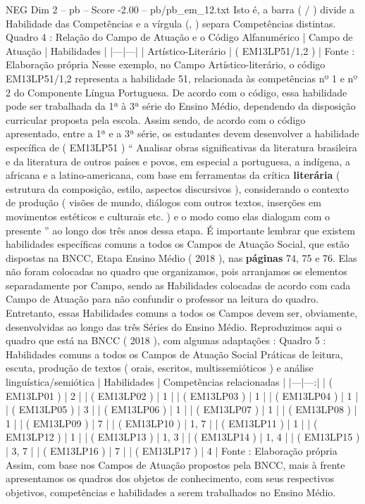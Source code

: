 \begin{textsample}{NEG Dim 2 – pb – Score -2.00 – pb/pb\_em\_12.txt}
Isto é, a barra ( / ) divide a Habilidade das Competências e a vírgula (, ) separa Competências distintas.
Quadro 4 : Relação do Campo de Atuação e o Código Alfanumérico | Campo de Atuação | Habilidades | |---|---| | Artístico-Literário | ( EM13LP51/1,2 ) | Fonte : Elaboração própria Nesse exemplo, no Campo Artístico-literário, o código EM13LP51/1,2 representa a habilidade 51, relacionada às competências nº 1 e nº 2 do Componente Língua Portuguesa.
De acordo com o código, essa habilidade pode ser trabalhada da 1ª à 3ª série do Ensino Médio, dependendo da disposição curricular proposta pela escola.
Assim sendo, de acordo com o código apresentado, entre a 1ª e a 3ª série, os estudantes devem desenvolver a habilidade específica de ( EM13LP51 ) “ Analisar obras significativas da literatura brasileira e da literatura de outros países e povos, em especial a portuguesa, a indígena, a africana e a latino-americana, com base em ferramentas da crítica \textbf{literária} ( estrutura da composição, estilo, aspectos discursivos ), considerando o contexto de produção ( visões de mundo, diálogos com outros textos, inserções em movimentos estéticos e culturais etc. ) e o modo como elas dialogam com o presente ” ao longo dos três anos dessa etapa.
É importante lembrar que existem habilidades específicas comuns a todos os Campos de Atuação Social, que estão dispostas na BNCC, Etapa Ensino Médio ( 2018 ), nas \textbf{páginas} 74, 75 e 76.
Elas não foram colocadas no quadro que organizamos, pois arranjamos os elementos separadamente por Campo, sendo as Habilidades colocadas de acordo com cada Campo de Atuação para não confundir o professor na leitura do quadro.
Entretanto, essas Habilidades comuns a todos os Campos devem ser, obviamente, desenvolvidas ao longo das três Séries do Ensino Médio.
Reproduzimos aqui o quadro que está na BNCC ( 2018 ), com algumas adaptações : Quadro 5 : Habilidades comuns a todos os Campos de Atuação Social Práticas de leitura, escuta, produção de textos ( orais, escritos, multissemióticos ) e análise linguística/semiótica | Habilidades | Competências relacionadas | |---|---:| | ( EM13LP01 ) | 2 | | ( EM13LP02 ) | 1 | | ( EM13LP03 ) | 1 | | ( EM13LP04 ) | 1 | | ( EM13LP05 ) | 3 | | ( EM13LP06 ) | 1 | | ( EM13LP07 ) | 1 | | ( EM13LP08 ) | 1 | | ( EM13LP09 ) | 7 | | ( EM13LP10 ) | 1, 7 | | ( EM13LP11 ) | 1 | | ( EM13LP12 ) | 1 | | ( EM13LP13 ) | 1, 3 | | ( EM13LP14 ) | 1, 4 | | ( EM13LP15 ) | 3, 7 | | ( EM13LP16 ) | 7 | | ( EM13LP17 ) | 4 | Fonte : Elaboração própria Assim, com base nos Campos de Atuação propostos pela BNCC, mais à frente apresentamos os quadros dos objetos de conhecimento, com seus respectivos objetivos, competências e habilidades a serem trabalhados no Ensino Médio.

\end{textsample}
